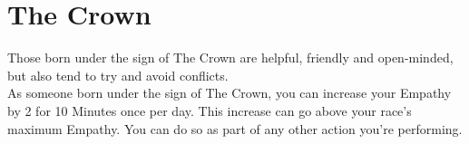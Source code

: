 \section{The Crown}\label{zodiac:crown}

Those born under the sign of The Crown are helpful, friendly and open-minded, but also tend to try and avoid conflicts.\\
As someone born under the sign of The Crown, you can increase your Empathy by 2 for 10 Minutes once per day.
This increase can go above your race's maximum Empathy.
You can do so as part of any other action you're performing.\\
